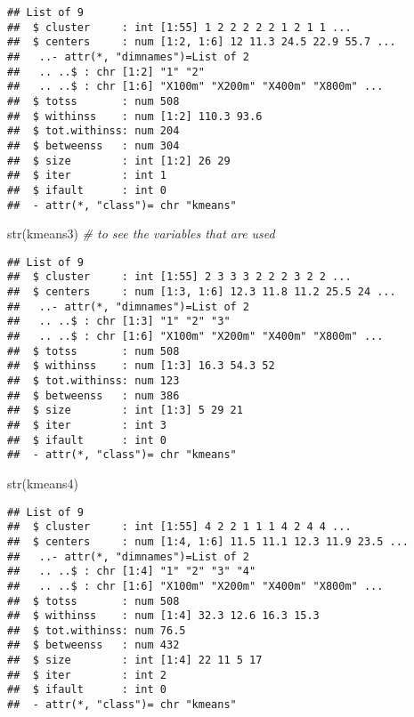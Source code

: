 \documentclass[
]{article}
\newenvironment{Shaded}{\begin{snugshade}}{\end{snugshade}}
\newcommand{\CommentTok}[1]{\textcolor[rgb]{0.56,0.35,0.01}{\textit{#1}}}
\newcommand{\FunctionTok}[1]{\textcolor[rgb]{0.00,0.00,0.00}{#1}}
\newcommand{\NormalTok}[1]{#1}
\begin{document}
\begin{verbatim}
## List of 9
##  $ cluster     : int [1:55] 1 2 2 2 2 2 1 2 1 1 ...
##  $ centers     : num [1:2, 1:6] 12 11.3 24.5 22.9 55.7 ...
##   ..- attr(*, "dimnames")=List of 2
##   .. ..$ : chr [1:2] "1" "2"
##   .. ..$ : chr [1:6] "X100m" "X200m" "X400m" "X800m" ...
##  $ totss       : num 508
##  $ withinss    : num [1:2] 110.3 93.6
##  $ tot.withinss: num 204
##  $ betweenss   : num 304
##  $ size        : int [1:2] 26 29
##  $ iter        : int 1
##  $ ifault      : int 0
##  - attr(*, "class")= chr "kmeans"
\end{verbatim}

\begin{Shaded}
\begin{Highlighting}[]
\FunctionTok{str}\NormalTok{(kmeans3) }\CommentTok{\# to see the variables that are used}
\end{Highlighting}
\end{Shaded}

\begin{verbatim}
## List of 9
##  $ cluster     : int [1:55] 2 3 3 3 2 2 2 3 2 2 ...
##  $ centers     : num [1:3, 1:6] 12.3 11.8 11.2 25.5 24 ...
##   ..- attr(*, "dimnames")=List of 2
##   .. ..$ : chr [1:3] "1" "2" "3"
##   .. ..$ : chr [1:6] "X100m" "X200m" "X400m" "X800m" ...
##  $ totss       : num 508
##  $ withinss    : num [1:3] 16.3 54.3 52
##  $ tot.withinss: num 123
##  $ betweenss   : num 386
##  $ size        : int [1:3] 5 29 21
##  $ iter        : int 3
##  $ ifault      : int 0
##  - attr(*, "class")= chr "kmeans"
\end{verbatim}

\begin{Shaded}
\begin{Highlighting}[]
\FunctionTok{str}\NormalTok{(kmeans4)}
\end{Highlighting}
\end{Shaded}

\begin{verbatim}
## List of 9
##  $ cluster     : int [1:55] 4 2 2 1 1 1 4 2 4 4 ...
##  $ centers     : num [1:4, 1:6] 11.5 11.1 12.3 11.9 23.5 ...
##   ..- attr(*, "dimnames")=List of 2
##   .. ..$ : chr [1:4] "1" "2" "3" "4"
##   .. ..$ : chr [1:6] "X100m" "X200m" "X400m" "X800m" ...
##  $ totss       : num 508
##  $ withinss    : num [1:4] 32.3 12.6 16.3 15.3
##  $ tot.withinss: num 76.5
##  $ betweenss   : num 432
##  $ size        : int [1:4] 22 11 5 17
##  $ iter        : int 2
##  $ ifault      : int 0
##  - attr(*, "class")= chr "kmeans"
\end{verbatim}
\end{document}
